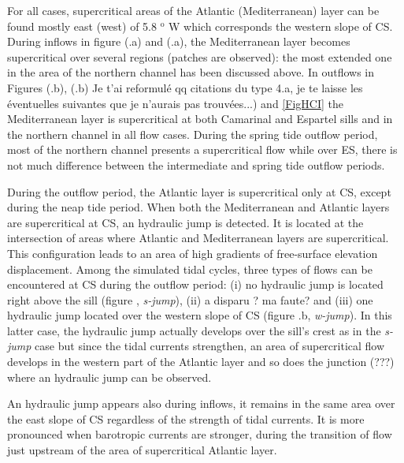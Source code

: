 For all cases, \color{blue} supercritical areas \color{black} of the Atlantic (Mediterranean) layer \color{blue} can be found \color{black} mostly east (west) of 5.8 $^\text{o}$ W which corresponds the western slope of CS. During inflows in figure  \color{blue}(.a) and (.a), the Mediterranean layer becomes supercritical over several regions (patches are observed): the most extended one in the area of the northern channel has been discussed above. In outflows in Figures (.b), (.b) \color{green} Je t'ai reformulé qq citations du type 4.a, je te laisse les éventuelles suivantes que je n'aurais pas trouvées...) \color{black} and \ref{FigHCI} the Mediterranean layer is supercritical at both Camarinal and Espartel sills and in the northern channel in all flow cases.  \color{blue}During the spring tide outflow period, most of the northern channel presents a supercritical flow while over ES, there is not much difference between the intermediate and spring tide outflow periods\color{black}.

\color{blue}During the outflow period, the Atlantic layer is supercritical only at CS, except during the neap tide period. When both the Mediterranean and Atlantic layers are supercritical at CS, an hydraulic jump is detected. It is located at the intersection of areas where Atlantic and Mediterranean layers are supercritical. This configuration leads to an area of high gradients of free-surface elevation displacement. Among the simulated tidal cycles, three types of flows can be encountered at CS during the outflow period: (i) no hydraulic jump is located right above the sill (figure , \textit{s-jump}),  \color{green} (ii) a disparu ? ma faute? \color{black} and (iii) one hydraulic jump located over the western slope of CS (figure .b, \textit{w-jump}). In this latter case, the hydraulic jump actually develops \color{black} over the sill's crest as in the \textit{s-jump} case but since the tidal currents strengthen, \color{blue} an area of supercritical flow develops in the western part of the Atlantic layer and so does the junction (???) where an hydraulic jump can be observed.\color{black} 

\color{blue}An hydraulic jump appears also during inflows, it remains in the same area over the east slope of CS regardless of the strength of tidal currents. It is more pronounced when barotropic currents are stronger, during the transition of flow just upstream of the area of supercritical Atlantic layer. \color{black}


